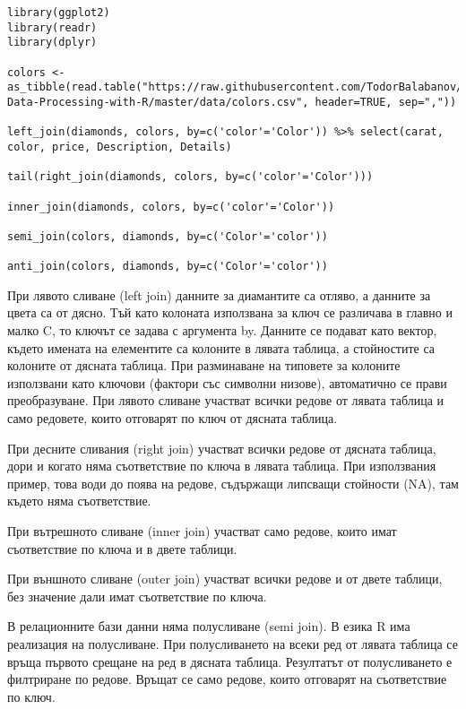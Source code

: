 \begin{lstlisting}[caption=Сложни сливания, label=listing0141]
library(ggplot2)
library(readr)
library(dplyr)

colors <- as_tibble(read.table("https://raw.githubusercontent.com/TodorBalabanov/Statistical-Data-Processing-with-R/master/data/colors.csv", header=TRUE, sep=","))

left_join(diamonds, colors, by=c('color'='Color')) %>% select(carat, color, price, Description, Details)

tail(right_join(diamonds, colors, by=c('color'='Color')))

inner_join(diamonds, colors, by=c('color'='Color'))

semi_join(colors, diamonds, by=c('Color'='color'))

anti_join(colors, diamonds, by=c('Color'='color'))
\end{lstlisting}

При лявото сливане (left join) данните за диамантите са отляво, а данните за цвета са от дясно. Тъй като колоната използвана за ключ се различава в главно и малко C, то ключът се задава с аргумента by. Данните се подават като вектор, където имената на елементите са колоните в лявата таблица, а стойностите са колоните от дясната таблица. При разминаване на типовете за колоните използвани като ключови (фактори със символни низове), автоматично се прави преобразуване. При лявото сливане участват всички редове от лявата таблица и само редовете, които отговарят по ключ от дясната таблица.

При десните сливания (right join) участват всички редове от дясната таблица, дори и когато няма съответствие по ключа в лявата таблица. При използвания пример, това води до поява на редове, съдържащи липсващи стойности (NA), там където няма съответствие.

При вътрешното сливане (inner join) участват само редове, които имат съответствие по ключа и в двете таблици.

При външното сливане (outer join) участват всички редове и от двете таблици, без значение дали имат съответствие по ключа.

В релационните бази данни няма полусливане (semi join). В езика R има реализация на полусливане. При полусливането на всеки ред от лявата таблица се връща първото срещане на ред в дясната таблица. Резултатът от полусливането е филтриране по редове. Връщат се само редове, които отговарят на съответствие по ключ.

